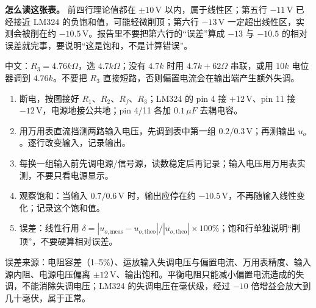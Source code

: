 \documentclass[11pt]{ctexart}
\let\origsubhdr\subhdr
\renewcommand{\subhdr}[1]{\needspace{3\baselineskip}\origsubhdr{#1}}
\begin{document}
\textbf{怎么读这张表。} 前四行理论值都在 \(\pm10\,\mathrm{V}\) 以内，属于线性区；第五行 \(-11\,\mathrm{V}\) 已经接近 LM324 的负饱和值，可能轻微削顶；第六行 \(-13\,\mathrm{V}\) 一定超出线性区，实测会被削在约 \(-10.5\,\mathrm{V}\)。报告里不要把第六行的“误差”算成 \(-13\) 与 \(-10.5\) 的相对误差就完事，要说明“这是饱和，不是计算错误”。



中文：\(R_3=4.76k\Omega\)，选 \(4.7k\Omega\)；没有 \(4.7k\) 时用 \(4.7k+62\Omega\) 串联，或用 \(10k\) 电位器调到 \(4.76k\)。不要把 \(R_3\) 直接短路，否则偏置电流会在输出端产生额外失调。


\begin{enumerate}
  \item 断电，按图接好 \(R_1\)、\(R_2\)、\(R_f\)、\(R_3\)；LM324 的 pin 4 接 \(+12\,\mathrm{V}\)、pin 11 接 \(-12\,\mathrm{V}\)，电源地接公共地；pin 4/11 各加 \(0.1\,\mu F\) 去耦电容。
  \item 用万用表直流挡测两路输入电压，先调到表中第一组 \(0.2/0.3\,\mathrm{V}\)；再测输出 \(u_o\)。逐行改变输入，记录输出。
  \item 每换一组输入前先调电源/信号源，读数稳定后再记录；输入电压用万用表实测，不要只看电源显示。
  \item 观察饱和：当输入 \(0.7/0.6\,\mathrm{V}\) 时，输出应停在约 \(-10.5\,\mathrm{V}\)，不再随输入线性变化；记录这个饱和值。
  \item 误差：线性行用 \(\delta=|u_{o,\text{meas}}-u_{o,\text{theo}}|/|u_{o,\text{theo}}|\times100\%\)；饱和行单独说明“削顶”，不要硬算相对误差。
\end{enumerate}

误差来源：电阻容差（1--5\%）、运放输入失调电压与偏置电流、万用表精度、输入源内阻、电源电压偏离 \(\pm12\,\mathrm{V}\)、输出饱和。平衡电阻只能减小偏置电流造成的失调，不能消除失调电压；LM324 的失调电压在毫伏级，经过 \(-10\) 倍增益会放大到几十毫伏，属于正常。
\end{document}
